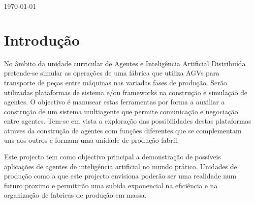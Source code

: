 \begin{titlepage}

{\large \today}\\[0cm] %


\tableofcontents


\section{Introdução} 

\justify\normalsize
No âmbito da unidade curricular de Agentes e Inteligência Artificial Distribuída pretende-se simular as operações de uma fábrica que utiliza AGVs para transporte de peças entre máquinas nas variadas fases de produção. Serão utilizadas plataformas de sistema e/ou frameworks na construção e simulação de agentes. O objectivo é manusear estas ferramentas por forma a auxiliar a construção de um sistema multiagente que permite comunicação e negociação entre agentes. Tem-se em vista a exploração das possibilidades destas plataformas atraves da construção de agentes com funções diferentes que se complementam uns aos outros e formam uma unidade de produção fabril.

Este projecto tem como objectivo principal a demonstração de possíveis aplicações de agentes de inteligência artificial no mundo prático. Unidades de produção como a que este projecto envisiona poderão ser uma realidade num futuro proximo e permitirão uma subida exponencial na eficiência e na organização de fabricas de produção em massa.


\newpage %


\end{titlepage}
